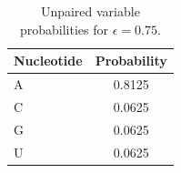 \begin{table}[H]
\centering\small
\caption{Unpaired variable probabilities for $\epsilon=0.75$.}
\label{tab:unpairedinit}
\begin{tabular}{@{}lc@{}}
\toprule
Nucleotide & Probability\\
\midrule
A & 0.8125\\
C & 0.0625\\
G & 0.0625\\
U & 0.0625\\
\bottomrule
\end{tabular}
\end{table}
